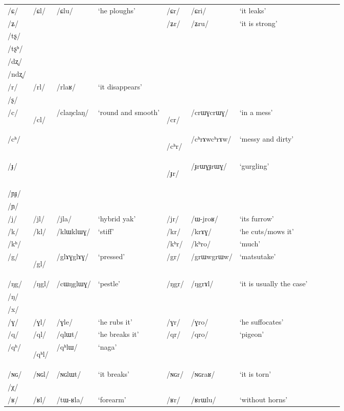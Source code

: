 \documentclass[oneside,a4paper,11pt]{article}
\newcommand{\ipa}[1]{\mbox{\phon/#1/}}
\newcommand{\deux}[1]{\ipa{#1}\addtocounter{2clusters}{1}}
\newcommand{\tib}[1]{\cellcolor{lightgray}\textbf{#1}}
\newcommand{\idph}[1]{\cellcolor{gray}\textbf{#1}}
\begin{document}
\begin{table}
{\begin{tabular}{lllllllllll}
\ipa{ɕ} & \deux{ɕl} & \ipa{ɕlu} & `he ploughs' & \deux{ɕr} & \ipa{ɕri} & `it leaks' \\ 
\ipa{ʑ} & & & & \deux{ʑr} & \ipa{ʑru} & `it is strong' \\ 
\ipa{tʂ} & & & & & & \\ 
\ipa{tʂʰ} & & & & & & \\ 
\ipa{dʐ} & & & & & & \\ 
\ipa{ndʐ} & & & & & & \\ 
\ipa{r} & \deux{rl} & \ipa{rlaʁ} & `it disappears' & & & \\ 
\ipa{ʂ} & & & & & & \\ 
\ipa{c} & \deux{cl} \idph{} & \ipa{claŋclaŋ} & `round and smooth' & \deux{cr} \idph{} & \ipa{crɯɣcrɯɣ} & `in a mess' \\ 
\ipa{cʰ} & & & & \deux{cʰr}\idph{} & \ipa{cʰrɤwcʰrɤw} & `messy and dirty' \\ 
\ipa{ɟ} & & & & \deux{ɟr} \idph{} & \ipa{ɟrɯɣɟrɯɣ} & `gurgling' \\ 
\ipa{ɲɟ} & & & & & & \\ 
\ipa{ɲ} & & & & & & \\ 
\ipa{j} & \deux{jl} & \ipa{jla} & `hybrid yak' & \deux{jr} & \ipa{ɯ-jroʁ} & `its furrow' \\ 
\ipa{k} & \deux{kl} & \ipa{klɯklɯɣ} & `stiff' & \deux{kr} & \ipa{krɤɣ} & `he cuts/mows it' \\ 
\ipa{kʰ} & & & & \deux{kʰr} & \ipa{kʰro} & `much' \\ 
\ipa{g} & \deux{gl} \idph{} & \ipa{glɤɣglɤɣ} & `pressed' & \deux{gr} & \ipa{grɯwgrɯw} & `matsutake' \\ 
\ipa{ŋg} & \deux{ŋgl} & \ipa{cɯŋglɯɣ} & `pestle' & \deux{ŋgr} & \ipa{ŋgrɤl} & `it is usually the case' \\ 
\ipa{ŋ} & & & & & & \\ 
\ipa{x} & & & & & & \\ 
\ipa{ɣ} & \deux{ɣl} & \ipa{ɣle} & `he rubs it' & \deux{ɣr} & \ipa{ɣro} & `he suffocates' \\ 
\ipa{q} & \deux{ql} & \ipa{qlɯt} & `he breaks it' & \deux{qr} & \ipa{qro} & `pigeon' \\ 
\ipa{qʰ} & \deux{qʰl} \tib{} & \ipa{qʰlɯ} & `naga' & & & \\ 
\ipa{ɴɢ} & \deux{ɴɢl} & \ipa{ɴɢlɯt} & `it breaks' & \deux{ɴɢr} & \ipa{ɴɢraʁ} & `it is torn' \\ 
\ipa{χ} & & & & & & \\ 
\ipa{ʁ} & \deux{ʁl} & \ipa{tɯ-ʁla} & `forearm' & \deux{ʁr} & \ipa{ʁrɯlu} & `without horns' \\ 
\midrule       
\end{tabular}}
\end{table}
\end{document}
